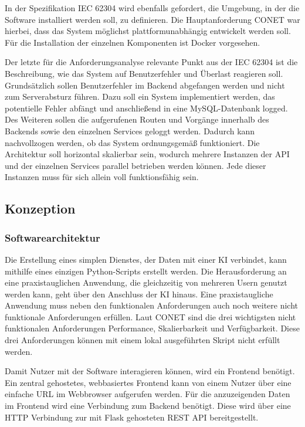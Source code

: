 In der Spezifikation IEC 62304 wird ebenfalls gefordert, die Umgebung, in der die Software installiert werden soll, zu definieren. Die Hauptanforderung CONET war hierbei, dass das System möglichst plattformunabhängig entwickelt werden soll. Für die Installation der einzelnen Komponenten ist Docker vorgesehen.

Der letzte für die Anforderungsanalyse relevante Punkt aus der IEC 62304 ist die Beschreibung, wie das System auf Benutzerfehler und Überlast reagieren soll. Grundsätzlich sollen Benutzerfehler im Backend abgefangen werden und nicht zum Serverabsturz führen. Dazu soll ein System implementiert werden, das potentielle Fehler abfängt und anschließend in eine MySQL-Datenbank logged. Des Weiteren sollen die aufgerufenen Routen und Vorgänge innerhalb des Backends sowie den einzelnen Services geloggt werden. Dadurch kann nachvollzogen werden, ob das System ordnungsgemäß funktioniert. Die Architektur soll horizontal skalierbar sein, wodurch mehrere Instanzen der API und der einzelnen Services parallel betrieben werden können. Jede dieser Instanzen muss für sich allein voll funktionsfähig sein.

\subsection{Konzeption}
\subsubsection{Softwarearchitektur}
Die Erstellung eines simplen Dienstes, der Daten mit einer KI verbindet, kann mithilfe eines einzigen Python-Scripts erstellt werden. Die Herausforderung an eine praxistauglichen Anwendung, die gleichzeitig von mehreren Usern genutzt werden kann, geht über den Anschluss der KI hinaus. Eine praxistaugliche Anwendung muss neben den funktionalen Anforderungen auch noch weitere nicht funktionale Anforderungen erfüllen. Laut CONET sind die drei wichtigsten nicht funktionalen Anforderungen Performance, Skalierbarkeit und Verfügbarkeit. Diese drei Anforderungen können mit einem lokal ausgeführten Skript nicht erfüllt werden. 

Damit Nutzer mit der Software interagieren können, wird ein Frontend benötigt. Ein zentral gehostetes, webbasiertes Frontend kann von einem Nutzer über eine einfache URL im Webbrowser aufgerufen werden. Für die anzuzeigenden Daten im Frontend wird eine Verbindung zum Backend benötigt. Diese wird über eine HTTP Verbindung zur mit Flask gehosteten REST API bereitgestellt.

